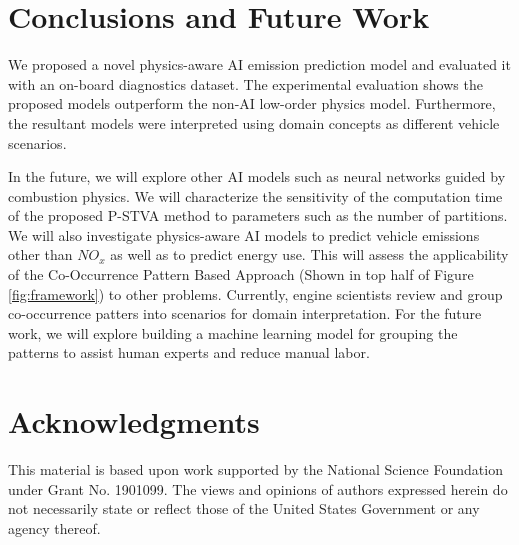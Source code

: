 \documentclass[letterpaper]{article} %
\begin{document}
\section{Conclusions and Future Work}
We proposed a novel physics-aware AI emission prediction model and evaluated it with an on-board diagnostics dataset. The experimental evaluation shows the proposed models outperform the non-AI low-order physics model. Furthermore, the resultant models were interpreted using domain concepts as different vehicle scenarios.

In the future, we will explore other AI models such as neural networks guided by combustion physics.  We will characterize the sensitivity of the computation time of the proposed P-STVA method to parameters such as the number of partitions.  We will also investigate physics-aware AI models to predict vehicle emissions other than $NO_{x}$ as well as to predict energy use. This will assess the applicability of the Co-Occurrence Pattern Based Approach (Shown in top half of Figure \ref{fig:framework}) to other problems. Currently, engine scientists review and group co-occurrence patters into scenarios for domain interpretation. For the future work, we will explore building a machine learning model for grouping the patterns to assist human experts and reduce manual labor. 

 \section{Acknowledgments}
 This material is based upon work supported by the National Science Foundation under Grant No. 1901099. The views and opinions of authors expressed herein do not necessarily state or reflect those of the United States Government or any agency thereof. 
 

\fontsize{9pt}{10pt} \selectfont




\end{document}
